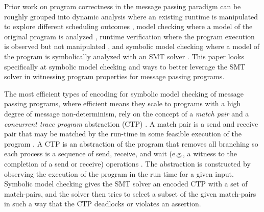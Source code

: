 Prior work on program correctness in the message passing paradigm can be roughly grouped into dynamic analysis where an existing runtime is manipulated to explore different scheduling outcomes \cite{DBLP:conf/ppopp/VakkalankaSGK08,DBLP:conf/sbmf/SharmaGB12}, model checking where a model of the original program is analyzed \cite{DBLP:conf/vmcai/Siegel07,DBLP:conf/pvm/Siegel07}, runtime verification where the program execution is observed but not manipulated \cite{DBLP:conf/sc/VetterS00,DBLP:conf/parco/KrammerBMR03,DBLP:conf/ptw/HilbrichSSM09}, and symbolic model checking where a model of the program is symbolically analyzed with an SMT solver \cite{DBLP:conf/kbse/HuangMM13,HuangNFM15,HuangDeadlock}. This paper looks specifically at symbolic model checking and ways to better leverage the SMT solver in witnessing program properties for message passing programs.

The most efficient types of encoding for symbolic model checking of message passing programs, where efficient means they scale to programs with a high degree of message non-determinism, rely on the concept of a \emph{match pair} and a \emph{concurrent trace program} abstraction (CTP) \cite{DBLP:conf/kbse/HuangMM13,HuangNFM15,HuangDeadlock,DBLP:conf/fm/ForejtKNS14,DBLP:conf/atva/ElwakilYW10,DBLP:conf/issta/ElwakilY10}. 
A match pair is a send and receive pair that may be matched by the run-time in some feasible execution of the program \cite{DBLP:conf/kbse/HuangMM13,HuangNFM15,HuangDeadlock,DBLP:conf/fm/ForejtKNS14,DBLP:conf/atva/ElwakilYW10,DBLP:conf/issta/ElwakilY10}. 
A CTP is an abstraction of the program that removes all branching so each process is a sequence of send, receive, and wait (e.g., a witness to the completion of a send or receive) operations \cite{DBLP:conf/kbse/HuangMM13,HuangNFM15,HuangDeadlock}. 
The abstraction is constructed by observing the execution of the program in the run time for a given input. Symbolic model checking gives the SMT solver an encoded CTP with a set of match-pairs, and the solver then tries to select a subset of the given  match-pairs in such a way that the CTP deadlocks or violates an assertion. 


